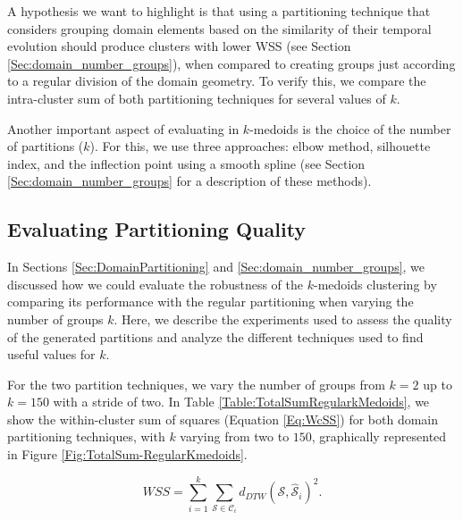 A hypothesis we want to highlight is that using a partitioning technique that considers grouping domain elements based on the similarity of their temporal evolution should produce clusters with lower WSS (see Section \ref{Sec:domain_number_groups}), when compared to creating groups just according to a regular division of the domain geometry. To verify this, we compare the intra-cluster sum of both partitioning techniques for several values of $k$.

Another important aspect of evaluating in $k$-medoids is the choice of the number of partitions ($k$). For this, we use three approaches: elbow method, silhouette index, and the inflection point using a smooth spline (see Section \ref{Sec:domain_number_groups} for a description of these methods).

\subsection{Evaluating Partitioning Quality}
\label{Sec:EvaluatingPP}

In Sections \ref{Sec:DomainPartitioning} and \ref{Sec:domain_number_groups}, we discussed how we could evaluate the robustness of the $k$-medoids clustering by comparing its performance with the regular partitioning when varying the number of groups $k$. Here, we describe the experiments used to assess the quality of the generated partitions and analyze the different techniques used to find useful values for $k$. 

For the two partition techniques, we vary the number of groups from $k=2$ up to $k=150$ with a stride of two. In Table \ref{Table:TotalSumRegularkMedoids}, we show the within-cluster sum of squares (Equation \ref{Eq:WcSS}) for both domain partitioning techniques, with $k$ varying from two to $150$, graphically represented in Figure \ref{Fig:TotalSum-RegularKmedoids}. 

\begin{equation}
    \label{Eq:WcSS}
    WSS = \sum_{i=1}^{k} \sum_{\mathcal{S} \in \mathcal{C}_{i}} d_{DTW} \left(\mathcal{S}, \mathcal{\hat{S}}_{i}\right)^{2}.
\end{equation}

